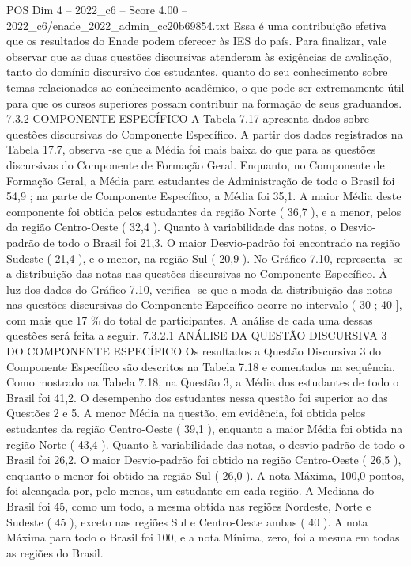 \begin{textsample}{POS Dim 4 – 2022\_c6 – Score 4.00 – 2022\_c6/enade\_2022\_admin\_cc20b69854.txt}
Essa é uma contribuição efetiva que os resultados do Enade podem oferecer às IES do país.
Para finalizar, vale observar que as duas questões discursivas atenderam às exigências de avaliação, tanto do domínio discursivo dos estudantes, quanto do seu conhecimento sobre temas relacionados ao conhecimento acadêmico, o que pode ser extremamente útil para que os cursos superiores possam contribuir na formação de seus graduandos. 7.3.2 COMPONENTE ESPECÍFICO A Tabela 7.17 apresenta dados sobre questões discursivas do Componente Específico.
A partir dos dados registrados na Tabela 17.7, observa -se que a Média foi mais baixa do que para as questões discursivas do Componente de Formação Geral.
Enquanto, no Componente de Formação Geral, a Média para estudantes de Administração de todo o Brasil foi 54,9 ; na parte de Componente Específico, a Média foi 35,1.
A maior Média deste componente foi obtida pelos estudantes da região Norte ( 36,7 ), e a menor, pelos da região Centro-Oeste ( 32,4 ).
Quanto à variabilidade das notas, o Desvio-padrão de todo o Brasil foi 21,3.
O maior Desvio-padrão foi encontrado na região Sudeste ( 21,4 ), e o menor, na região Sul ( 20,9 ).
No Gráfico 7.10, representa -se a distribuição das notas nas questões discursivas no Componente Específico.
À luz dos dados do Gráfico 7.10, verifica -se que a moda da distribuição das notas nas questões discursivas do Componente Específico ocorre no intervalo ( 30 ; 40 ], com mais que 17 \% do total de participantes.
A análise de cada uma dessas questões será feita a seguir. 7.3.2.1 ANÁLISE DA QUESTÃO DISCURSIVA 3 DO COMPONENTE ESPECÍFICO Os resultados a Questão Discursiva 3 do Componente Específico são descritos na Tabela 7.18 e comentados na sequência.
Como mostrado na Tabela 7.18, na Questão 3, a Média dos estudantes de todo o Brasil foi 41,2.
O desempenho dos estudantes nessa questão foi superior ao das Questões 2 e 5.
A menor Média na questão, em evidência, foi obtida pelos estudantes da região Centro-Oeste ( 39,1 ), enquanto a maior Média foi obtida na região Norte ( 43,4 ).
Quanto à variabilidade das notas, o desvio-padrão de todo o Brasil foi 26,2.
O maior Desvio-padrão foi obtido na região Centro-Oeste ( 26,5 ), enquanto o menor foi obtido na região Sul ( 26,0 ).
A nota Máxima, 100,0 pontos, foi alcançada por, pelo menos, um estudante em cada região.
A Mediana do Brasil foi 45, como um todo, a mesma obtida nas regiões Nordeste, Norte e Sudeste ( 45 ), exceto nas regiões Sul e Centro-Oeste ambas ( 40 ).
A nota Máxima para todo o Brasil foi 100, e a nota Mínima, zero, foi a mesma em todas as regiões do Brasil.

\end{textsample}
